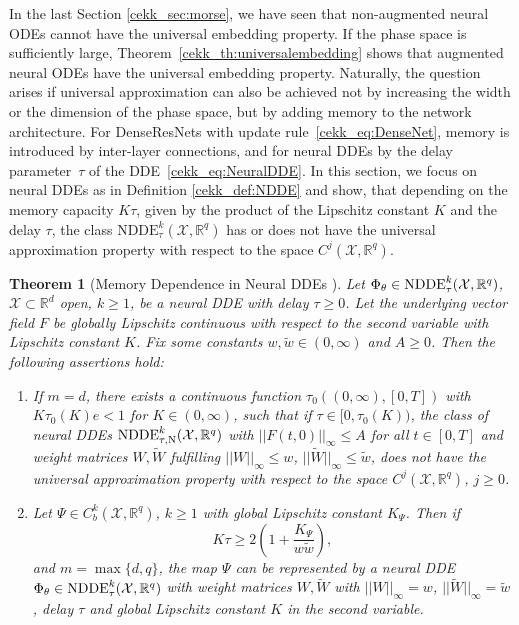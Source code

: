 \documentclass[10pt]{article}
\newcommand{\R}{{\mathbb R}}
\def\R{\mathbb{R}}
\newtheorem{theorem}{Theorem}[section]
\begin{document}
In the last Section \ref{cekk_sec:morse}, we have seen that non-augmented neural ODEs cannot have the universal embedding property. If the phase space is sufficiently large, Theorem~\ref{cekk_th:universalembedding} shows that augmented neural ODEs have the universal embedding property. Naturally, the question arises if universal approximation can also be achieved not by increasing the width or the dimension of the phase space, but by adding memory  to the network architecture. For DenseResNets with update rule~\eqref{cekk_eq:DenseNet}, memory is introduced by inter-layer connections, and for neural DDEs by the delay parameter~$\tau$ of the DDE~\eqref{cekk_eq:NeuralDDE}.  In this section, we focus on neural DDEs as in Definition \ref{cekk_def:NDDE} and show, that depending on the memory capacity  $K\tau$, given by the product of the Lipschitz constant $K$ and the delay $\tau$, the class $\text{NDDE}^k_\tau(\mathcal{X},\R^q)$ has or does not have the universal approximation property with respect to the space $C^j(\mathcal{X},\R^q)$.


\begin{theorem}[Memory Dependence in Neural DDEs \cite{KuehnKuntz2025}] \label{cekk_th:memory}
	 Let $\Phi_\theta \in \textup{NDDE}_{\tau}^k(\mathcal{X},\R^q)$, $\mathcal{X} \subset \R^d$ open, $k\geq 1$, be a neural DDE with delay $\tau\geq0$. Let the underlying vector field $F$ be globally Lipschitz continuous with respect to the second variable with Lipschitz constant $K$. Fix some constants $w, \tilde w \in (0,\infty)$ and $A \geq 0$. Then the following assertions hold:
	\begin{enumerate}[label=(\alph*), font=\normalfont]
		\item If $m = d$, there exists a continuous function $\tau_0((0,\infty),[0,T])$ with $K\tau_0(K)e<1$ for $K\in(0,\infty)$, such that if $\tau\in[0,\tau_0(K))$, the class of neural DDEs $\textup{NDDE}^k_{\tau,\textup{N}}(\mathcal{X},\R^q)$ with $\vert\vert{F(t,0)}\vert\vert_\infty \leq A$ for all $t\in [0,T]$ and weight matrices $W, \widetilde{W}$ fulfilling $\vert\vert W \vert\vert_\infty \leq w$, $\vert\vert\widetilde W\vert\vert_\infty \leq \tilde w$, does not have the universal approximation property with respect to the space $C^j(\mathcal{X},\R^q)$, $j\geq 0$.
		\item Let $\Psi\in C^k_b(\mathcal{X},\R^q)$, $k\geq 1$ with global Lipschitz constant $K_\Psi$. Then if
		\begin{equation*}
			K\tau \geq 2\left(1+\frac{K_\Psi}{w \tilde w}\right),
		\end{equation*}
		and $m = \max\{d,q\}$, the map $\Psi$ can be represented by a neural DDE $\Phi_\theta\in\textup{NDDE}^k_{\tau}(\mathcal{X},\R^q)$ with weight matrices $W, \widetilde{W}$ with $\vert\vert{W}\vert\vert_\infty = w$, $\vert\vert\widetilde W\vert\vert_\infty = \tilde w$, delay $\tau$ and global Lipschitz constant $K$ in the second variable.
	\end{enumerate}
\end{theorem}
\end{document}
